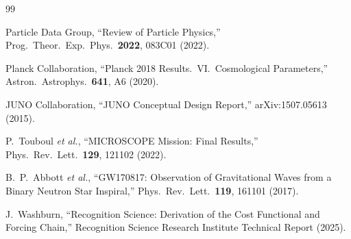 \documentclass[12pt,a4paper]{article}
\theoremstyle{definition}
\theoremstyle{remark}
\begin{document}
\begin{thebibliography}{99}

Particle Data Group, ``Review of Particle Physics,'' Prog.\ Theor.\
Exp.\ Phys.\ \textbf{2022}, 083C01 (2022).

Planck Collaboration, ``Planck 2018 Results.\ VI.\ Cosmological
Parameters,'' Astron.\ Astrophys.\ \textbf{641}, A6 (2020).

JUNO Collaboration, ``JUNO Conceptual Design Report,'' arXiv:1507.05613
(2015).

P.~Touboul \emph{et al.}, ``MICROSCOPE Mission: Final Results,''
Phys.\ Rev.\ Lett.\ \textbf{129}, 121102 (2022).

B.~P.~Abbott \emph{et al.}, ``GW170817: Observation of Gravitational
Waves from a Binary Neutron Star Inspiral,'' Phys.\ Rev.\ Lett.\
\textbf{119}, 161101 (2017).

J.~Washburn, ``Recognition Science: Derivation of the Cost
Functional and Forcing Chain,'' Recognition Science Research
Institute Technical Report (2025).

\end{thebibliography}
\end{document}
